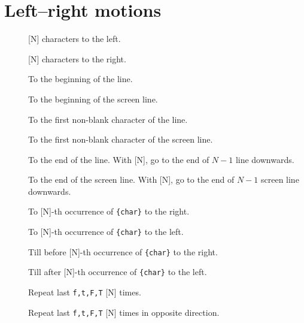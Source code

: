\section{Left--right motions}
\begin{description}
  \item[] [N] characters to the left.
  \item[] [N] characters to the right.
  \item[] To the beginning of the line.
  \item[] To the beginning of the screen line.
  \item[\syntax{^}] To the first non-blank character of the line.
  \item[] To the first non-blank character of the screen line.
  \item[\syntax{[N]$%
    }] To the end of the line. With [N], go to the end of $N-1$ line downwards.
  \item[] To the end of the screen line. With [N], go to the end of $N-1$ screen line downwards.
  \item[] To [N]-th occurrence of \verb|{char}| to the right.
  \item[] To [N]-th occurrence of \verb|{char}| to the left.
  \item[] Till before [N]-th occurrence of \verb|{char}| to the right.
  \item[] Till after [N]-th occurrence of \verb|{char}| to the left.
  \item[\syntax{[N];}] Repeat last \verb|f,t,F,T| [N] times.
  \item[\syntax{[N],}] Repeat last \verb|f,t,F,T| [N] times in opposite direction.
\end{description}
